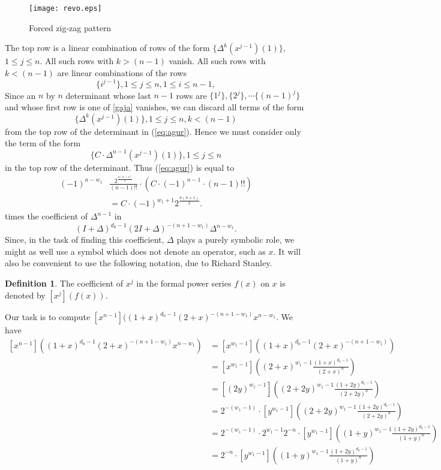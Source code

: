 \documentclass[10pt,reqno]{amsart}
\theoremstyle{plain}
\theoremstyle{definition}
\newtheorem{Def}{Definition}
\theoremstyle{remark}
\begin{document}
\begin{figure}
        \begin{minipage}[b]{0.5\linewidth}
                \centering \texttt{[image: revo.eps]}
                \caption{Forced zig-zag pattern}\label{fig:revo}
        \end{minipage}
\end{figure}

The top row is a linear combination of rows of the form
$\{\Delta^k(x^{j-1})(1)\}$, $1\leq j\leq n$. All such rows with 
$k>(n-1)$ vanish. All such rows with $k<(n-1)$ are linear combinations of 
the rows
\[
\{i^{j-1}\}, 1\leq j\leq n, 1\leq i\leq n-1,\label{gaja}
\]
Since an $n$ by $n$ determinant whose last $n-1$ rows are
$\{1^j\},\{2^j\},\dotsb \{(n-1)^j\}$ and whose first row is one of
\ref{gaja} vanishes, we can discard all terms of the form
\[\{\Delta^k(x^{j-1})(1)\}, 1\leq j\leq n, k<(n-1)\]
from the top row of the determinant in
(\ref{eq:agur}). Hence we must consider only
the term of the form 
\[\{C\cdot \Delta^{n-1}(x^{j-1})(1)\} , 1\leq j\leq n\]
in the top row of the determinant. Thus (\ref{eq:agur}) is equal to
\[
\begin{aligned}
\label{eq:malbona}
(-1)^{n-w_1} &\frac{2^{\frac{n(n+1)}{2} }}{(n-1)!!}\cdot 
(C\cdot (-1)^{n-1}\cdot (n-1)!!)\\
&= C\cdot (-1)^{w_1+1} 2^{\frac{n(n+1)}{2}}.
\end{aligned}
\]
times
the coefficient of $\Delta^{n-1}$ in \[(I+\Delta)^{d_0-1}
(2I+\Delta)^{-(n+1-w_1)} \Delta^{n-w_1}.\] Since, in the task of finding 
this coefficient, $\Delta$ plays a purely symbolic role, we might
as well use a symbol which does not denote an operator, such as $x$.
It will also be convenient to use the following notation, due to
Richard Stanley.
\begin{Def} The coefficient of $x^j$ in the formal power series $f(x)$
on $x$ is denoted by $[x^j](f(x))$.
\end{Def}

Our task is to compute 
$[x^{n-1}]((1+x)^{d_0-1} (2+x)^{-(n+1-w_1)} x^{n-w_1}$. We have
\[
\begin{aligned}
\label{eq:seventeen}
[x^{n-1}]((1+x)^{d_0-1} (2+x)^{-(n+1-w_1)} x^{n-w_1}) &=
[x^{w_1-1}]((1+x)^{d_0-1} (2+x)^{-(n+1-w_1)}) \\
&= [x^{w_1-1}]((2+x)^{w_1-1} \frac{(1+x)^{d_0-1}}{(2+x)^n}) \\
&= [(2y)^{w_1-1}]((2+2y)^{w_1-1} \frac{(1+2y)^{d_0-1}}{(2+2y)^n}) \\
&= 2^{-(w_1-1)} \cdot
[y^{w_1-1}]((2+2y)^{w_1-1} \frac{(1+2y)^{d_0-1}}{(2+2y)^n}) \\
&= 2^{-(w_1-1)} \cdot 2^{w_1-1} 2^{-n} \cdot
[y^{w_1-1}]((1+y)^{w_1-1} \frac{(1+2y)^{d_0-1}}{(1+y)^n}) \\
&= 2^{-n} \cdot
[y^{w_1-1}]((1+y)^{w_1-1} \frac{(1+2y)^{d_0-1}}{(1+y)^n})
\end{aligned}
\]
\end{document}

